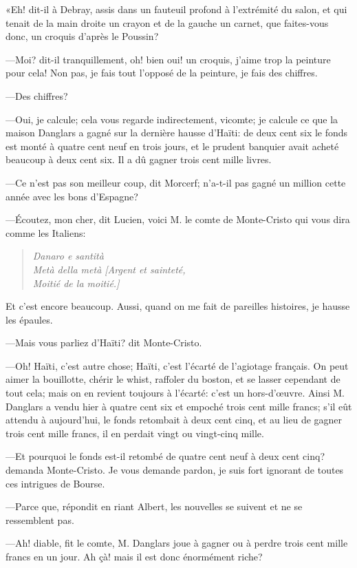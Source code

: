 «Eh! dit-il à Debray, assis dans un fauteuil profond à l'extrémité du salon, et qui tenait de la main droite un crayon et de la gauche un carnet, que faites-vous donc, un croquis d'après le Poussin? 

—Moi? dit-il tranquillement, oh! bien oui! un croquis, j'aime trop la peinture pour cela! Non pas, je fais tout l'opposé de la peinture, je fais des chiffres. 

—Des chiffres?  

—Oui, je calcule; cela vous regarde indirectement, vicomte; je calcule ce que la maison Danglars a gagné sur la dernière hausse d'Haïti: de deux cent six le fonds est monté à quatre cent neuf en trois jours, et le prudent banquier avait acheté beaucoup à deux cent six. Il a dû gagner trois cent mille livres. 

—Ce n'est pas son meilleur coup, dit Morcerf; n'a-t-il pas gagné un million cette année avec les bons d'Espagne? 

—Écoutez, mon cher, dit Lucien, voici M. le comte de Monte-Cristo qui vous dira comme les Italiens: 

\begin{verse}\itshape
Danaro e santità\\Metà della metà
[Argent et sainteté,\\Moitié de la moitié.]
\end{verse}

Et c'est encore beaucoup. Aussi, quand on me fait de pareilles histoires, je hausse les épaules. 

—Mais vous parliez d'Haïti? dit Monte-Cristo. 

—Oh! Haïti, c'est autre chose; Haïti, c'est l'écarté de l'agiotage français. On peut aimer la bouillotte, chérir le whist, raffoler du boston, et se lasser cependant de tout cela; mais on en revient toujours à l'écarté: c'est un hors-d'œuvre. Ainsi M. Danglars a vendu hier à quatre cent six et empoché trois cent mille francs; s'il eût attendu à aujourd'hui, le fonds retombait à deux cent cinq, et au lieu de gagner trois cent mille francs, il en perdait vingt ou vingt-cinq mille. 

—Et pourquoi le fonds est-il retombé de quatre cent neuf à deux cent cinq? demanda Monte-Cristo. Je vous demande pardon, je suis fort ignorant de toutes ces intrigues de Bourse. 

—Parce que, répondit en riant Albert, les nouvelles se suivent et ne se ressemblent pas. 

—Ah! diable, fit le comte, M. Danglars joue à gagner ou à perdre trois cent mille francs en un jour. Ah çà! mais il est donc énormément riche? 

